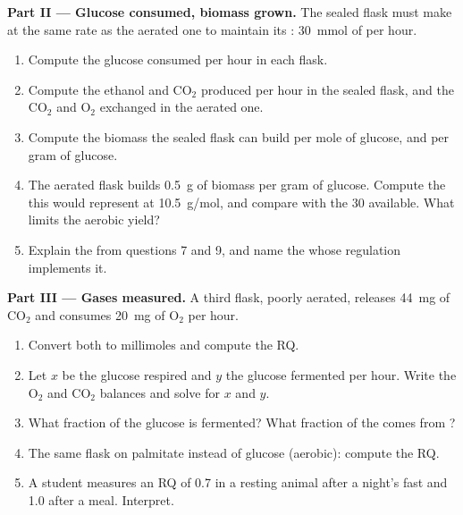 \begin{problem}
\medskip
\noindent\textbf{Part II --- Glucose consumed, biomass grown.}
The sealed flask must make  at the same rate as the aerated one to
maintain its : \qty{30}{mmol} of  per hour.
\begin{enumerate}[resume]
  \item Compute the glucose consumed per hour in each flask.
  \item Compute the ethanol and $\mathrm{CO_2}$ produced per hour in
        the sealed flask, and the $\mathrm{CO_2}$ and $\mathrm{O_2}$
        exchanged in the aerated one.
  \item Compute the biomass the sealed flask can build per mole of
        glucose, and per gram of glucose.
  \item The aerated flask builds \qty{0.5}{g} of biomass per gram of
        glucose. Compute the  this would represent at
        \qty{10.5}{g/mol}, and compare with the 30  available. What
        limits the aerobic yield?
  \item Explain the  from questions 7 and 9, and name
        the  whose regulation implements it.
\end{enumerate}

\medskip
\noindent\textbf{Part III --- Gases measured.}
A third flask, poorly aerated, releases \qty{44}{mg} of $\mathrm{CO_2}$
and consumes \qty{20}{mg} of $\mathrm{O_2}$ per hour.
\begin{enumerate}[resume]
  \item Convert both to millimoles and compute the RQ.
  \item Let $x$ be the glucose respired and $y$ the glucose fermented
        per hour. Write the $\mathrm{O_2}$ and $\mathrm{CO_2}$ balances
        and solve for $x$ and $y$.
  \item What fraction of the glucose is fermented? What fraction of the
         comes from ?
  \item The same flask on palmitate instead of glucose (aerobic):
        compute the RQ.
  \item A student measures an RQ of 0.7 in a resting animal after a
        night's fast and 1.0 after a meal. Interpret.
\end{enumerate}


\end{problem}
